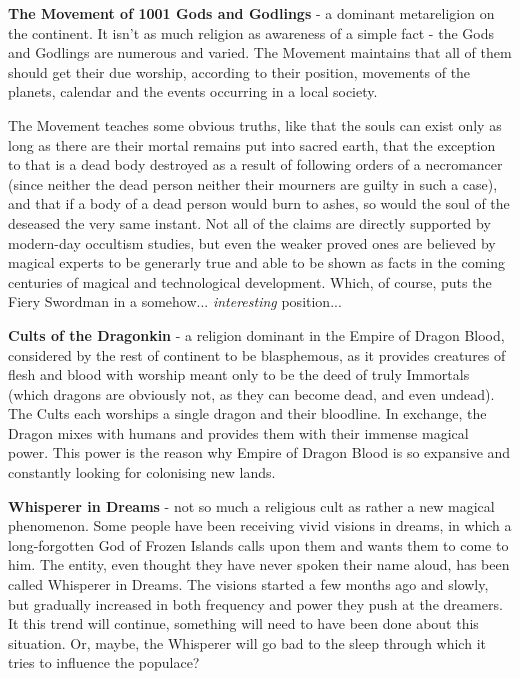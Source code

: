 \documentclass[a4paper,11pt]{article}
\begin{document}
\textbf{The Movement of 1001 Gods and Godlings} - a dominant metareligion on the continent. It isn't as much religion as awareness of a simple fact - the Gods and Godlings are numerous and varied. The Movement maintains that all of them should get their due worship, according to their position, movements of the planets, calendar and the events occurring in a local society. 

The Movement teaches some obvious truths, like that the souls can exist only as long as there are their mortal remains put into sacred earth, that the exception to that is a dead body destroyed as a result of following orders of a necromancer (since neither the dead person neither their mourners are guilty in such a case), and that if a body of a dead person would burn to ashes, so would the soul of the deseased the very same instant. Not all of the claims are directly supported by modern-day occultism studies, but even the weaker proved ones are believed by magical experts to be generarly true and able to be shown as facts in the coming centuries of magical and technological development. Which, of course, puts the Fiery Swordman in a somehow... \textit{interesting} position...

\textbf{Cults of the Dragonkin} - a religion dominant in the Empire of Dragon Blood, considered by the rest of continent to be blasphemous, as it provides creatures of flesh and blood with worship meant only to be the deed of truly Immortals (which dragons are obviously not, as they can become dead, and even undead). The Cults each worships a single dragon and their bloodline. In exchange, the Dragon mixes with humans and provides them with their immense magical power. This power is the reason why Empire of Dragon Blood is so expansive and constantly looking for colonising new lands. 

\textbf{Whisperer in Dreams} - not so much a religious cult as rather a new magical phenomenon. Some people have been receiving vivid visions in dreams, in which a long-forgotten God of Frozen Islands calls upon them and wants them to come to him. The entity, even thought they have never spoken their name aloud, has been called Whisperer in Dreams. The visions started a few months ago and slowly, but gradually increased in both frequency and power they push at the dreamers. It this trend will continue, something will need to have been done about this situation. Or, maybe, the Whisperer will go bad to the sleep through which it tries to influence the populace?  

\newpage
\end{document}
